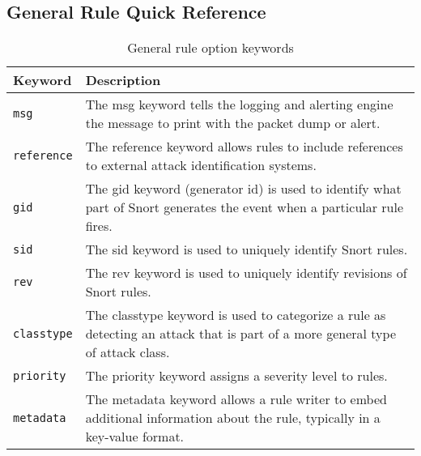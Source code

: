 \documentclass[english]{report}
\begin{document}
\subsection{General Rule Quick Reference}
\begin{center}
\begin{longtable}[h]{| p{1in} | p{4.5in} |}
\caption{General rule option keywords} \\

\hline
Keyword & Description \\
\hline

\hline
\texttt{msg} &

The msg keyword tells the logging and alerting engine the message to print with
the packet dump or alert. \\

\hline
\texttt{reference} &

The reference keyword allows rules to include references to external attack
identification systems. \\

\hline
\texttt{gid} &

The gid keyword (generator id) is used to identify what part of Snort generates
the event when a particular rule fires. \\

\hline
\texttt{sid} &

The sid keyword is used to uniquely identify Snort rules. \\

\hline
\texttt{rev} &

The rev keyword is used to uniquely identify revisions of Snort rules. \\

\hline
\texttt{classtype} &

The classtype keyword is used to categorize a rule as detecting an attack that
is part of a more general type of attack class. \\

\hline
\texttt{priority} &

The priority keyword assigns a severity level to rules. \\

\hline
\texttt{metadata} &

The metadata keyword allows a rule writer to embed additional information about
the rule, typically in a key-value format. \\

\hline
\end{longtable}
\end{center}
\end{document}
